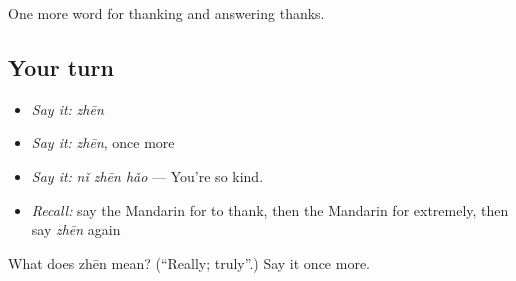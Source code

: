 \begin{grammarlens}[title={What you've built}]
One more word for thanking and answering thanks.
\end{grammarlens}

\subsection*{Your turn}
\begin{itemize}
\raggedright
  \item \emph{Say it:} \emph{zhēn}
  \item \emph{Say it:} \emph{zhēn}, once more
  \item \emph{Say it:} \emph{nǐ zhēn hǎo} — You're so kind.
  \item \emph{Recall:} say the Mandarin for to thank, then the Mandarin for extremely, then say \emph{zhēn} again
\end{itemize}

\begin{tcolorbox}[breakable,colback=teal!4,colframe=teal!35!black,title={Before you move on}]
What does zhēn mean? (\textquotedblleft{}Really; truly\textquotedblright{}.) Say it once more.
\end{tcolorbox}
